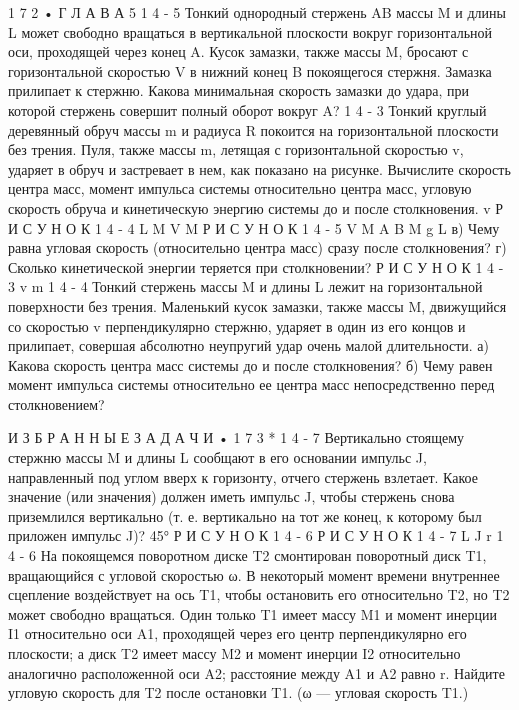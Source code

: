 \documentclass[10pt,oneside]{article}
\begin{document}
1 7 2 • Г Л А В А  5 \emph{ } 1 4 - 5 Тонкий однородный стержень AB массы M и длины L может свободно вращаться в вертикальной плоскости вокруг горизонтальной оси, проходящей через конец A. Кусок замазки, также массы M, бросают с горизонтальной скоростью V в нижний конец B покоящегося стержня. Замазка прилипает к стержню. Какова минимальная скорость замазки до удара, при которой стержень совершит полный оборот вокруг A? \emph{ } 1 4 - 3 Тонкий круглый деревянный обруч массы m и радиуса R покоится на горизонтальной плоскости без трения. Пуля, также массы m, летящая с горизонтальной скоростью v, ударяет в обруч и застревает в нем, как показано на рисунке. Вычислите скорость центра масс, момент импульса системы относительно центра масс, угловую скорость обруча и кинетическую энергию системы до и после столкновения. v Р И С У Н О К  1 4 - 4 L M V M Р И С У Н О К  1 4 - 5 V M A B M g L в) Чему равна угловая скорость (относительно центра масс) сразу после столкновения? г) Сколько кинетической энергии теряется при столкновении? Р И С У Н О К  1 4 - 3 v m \emph{ } 1 4 - 4 Тонкий стержень массы M и длины L лежит на горизонтальной поверхности без трения. Маленький кусок замазки, также массы M, движущийся со скоростью v перпендикулярно стержню, ударяет в один из его концов и прилипает, совершая абсолютно неупругий удар очень малой длительности. а) Какова скорость центра масс системы до и после столкновения? б) Чему равен момент импульса системы относительно ее центра масс непосредственно перед столкновением?\par

И З Б Р А Н Н Ы Е  З А Д А Ч И • 1 7 3 \emph{ } * 1 4 - 7 Вертикально стоящему стержню массы M и длины L сообщают в его основании импульс J, направленный под углом вверх к горизонту, отчего стержень взлетает. Какое значение (или значения) должен иметь импульс J, чтобы стержень снова приземлился вертикально (т. е. вертикально на тот же конец, к которому был приложен импульс J)? 45° Р И С У Н О К  1 4 - 6 Р И С У Н О К  1 4 - 7 L J r \emph{ } 1 4 - 6 На покоящемся поворотном диске T2 смонтирован поворотный диск T1, вращающийся с угловой скоростью ω. В некоторый момент времени внутреннее сцепление воздействует на ось T1, чтобы остановить его относительно T2, но T2 может свободно вращаться. Один только T1 имеет массу M1 и момент инерции I1 относительно оси A1, проходящей через его центр перпендикулярно его плоскости; а диск T2 имеет массу M2 и момент инерции I2 относительно аналогично расположенной оси A2; расстояние между A1 и A2 равно r. Найдите угловую скорость для T2 после остановки T1. (ω --- угловая скорость T1.)\par
\end{document}
